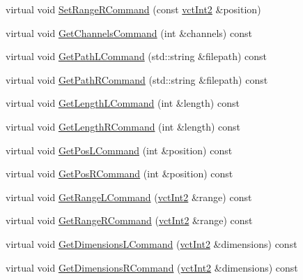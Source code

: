 \begin{DoxyCompactItemize}
\item 
virtual void \hyperlink{classsvl_filter_source_video_file_ac78b9b12bb31557020c34822248b8231}{Set\-Range\-R\-Command} (const \hyperlink{vct_fixed_size_vector_types_8h_add8c88eb6a432b15f14b866b9c35325f}{vct\-Int2} \&position)
\item 
virtual void \hyperlink{classsvl_filter_source_video_file_ac833baec6619f2483f66e057268b2b22}{Get\-Channels\-Command} (int \&channels) const 
\item 
virtual void \hyperlink{classsvl_filter_source_video_file_ae09a83350d176eb26a323af301d13576}{Get\-Path\-L\-Command} (std\-::string \&filepath) const 
\item 
virtual void \hyperlink{classsvl_filter_source_video_file_ad6cd961bd423947df2392c88b651c23f}{Get\-Path\-R\-Command} (std\-::string \&filepath) const 
\item 
virtual void \hyperlink{classsvl_filter_source_video_file_a83c39385856f80b777014b3667d475c3}{Get\-Length\-L\-Command} (int \&length) const 
\item 
virtual void \hyperlink{classsvl_filter_source_video_file_afe2a9891303d688e681a288938865095}{Get\-Length\-R\-Command} (int \&length) const 
\item 
virtual void \hyperlink{classsvl_filter_source_video_file_a8d2661ac0ebddbe82c7f9c10eba02c0d}{Get\-Pos\-L\-Command} (int \&position) const 
\item 
virtual void \hyperlink{classsvl_filter_source_video_file_a5377a376d1598177cb8d4b6d6e5f7120}{Get\-Pos\-R\-Command} (int \&position) const 
\item 
virtual void \hyperlink{classsvl_filter_source_video_file_ad7727bb1fd9f37de5aceb1c7ad6a3f06}{Get\-Range\-L\-Command} (\hyperlink{vct_fixed_size_vector_types_8h_add8c88eb6a432b15f14b866b9c35325f}{vct\-Int2} \&range) const 
\item 
virtual void \hyperlink{classsvl_filter_source_video_file_ae6fb6ee337099293a4aa1286a8a86bba}{Get\-Range\-R\-Command} (\hyperlink{vct_fixed_size_vector_types_8h_add8c88eb6a432b15f14b866b9c35325f}{vct\-Int2} \&range) const 
\item 
virtual void \hyperlink{classsvl_filter_source_video_file_ab852fecc3903aeebf419c2bc7a57319b}{Get\-Dimensions\-L\-Command} (\hyperlink{vct_fixed_size_vector_types_8h_add8c88eb6a432b15f14b866b9c35325f}{vct\-Int2} \&dimensions) const 
\item 
virtual void \hyperlink{classsvl_filter_source_video_file_ae7ac2fdf4049ffd6e7a1d34a38fbab4d}{Get\-Dimensions\-R\-Command} (\hyperlink{vct_fixed_size_vector_types_8h_add8c88eb6a432b15f14b866b9c35325f}{vct\-Int2} \&dimensions) const 

\end{DoxyCompactItemize}
